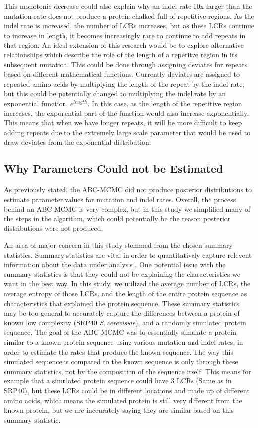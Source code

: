 \documentclass[10pt]{article}
\newcommand{\scshrt}{\mbox{\textit{S.\,cerevisiae}}\xspace}
\begin{document}
This monotonic decrease could also explain why an indel rate 10x larger than the mutation rate does not produce a protein chalked full of repetitive regions. As the indel rate is increased, the number of LCRs increases, but as these LCRs continue to increase in length, it becomes increasingly rare to continue to add repeats in that region. An ideal extension of this research would be to explore alternative relationships which describe the role of the length of a repetitve region in its subsequent mutation. This could be done through assigning deviates for repeats based on different mathematical functions. Currently deviates are assigned to repeated amino acids by multiplying the length of the repeat by the indel rate, but this could be potentially changed to multiplying the indel rate by an exponential function, $e^{length}$. In this case, as the length of the repetitive region increases, the exponential part of the function would also increase exponentially. This means that when we have longer repeats, it will be more difficult to keep adding repeats due to the extremely large scale parameter that would be used to draw deviates from the exponential distribution.

\subsection{Why Parameters Could not be Estimated}

As previously stated, the ABC-MCMC did not produce posterior distributions to estimate parameter values for mutation and indel rates. Overall, the process behind an ABC-MCMC is very complex, but in this study we simplified many of the steps in the algorithm, which could potentially be the reason posterior distributions were not produced. 

An area of major concern in this study stemmed from the chosen summary statistics. Summary statistics are vital in order to quantitatively capture relevent information about the data under analysis \citep{sunnaaker2013approximate}. One potential issue with the summary statistics is that they could not be explaining the characteristics we want in the best way. In this study, we utilized the average number of LCRs, the average entropy of those LCRs, and the length of the entire protein sequence as characteristics that explained the protein sequence. These summary statistics may be too general to accurately capture the differences between a protein of known low complexity (SRP40 \scshrt), and a randomly simulated protein sequence. The goal of the ABC-MCMC was to essentially simulate a protein similar to a known protein sequence using various mutation and indel rates, in order to estimate the rates that produce the known sequence. The way this simulated sequence is compared to the known sequence is only through these summary statistics, not by the composition of the sequence itself. This means for example that a simulated protein sequence could have 3 LCRs (Same as in SRP40), but these LCRs could be in different locations and made up of different amino acids, which means the simulated protein is still very different from the known protein, but we are inccurately saying they are similar based on this summary statistic.
\end{document}
